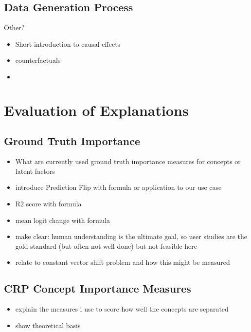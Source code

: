 \subsection{Data Generation Process}

Other?

\begin{itemize}
    \item Short introduction to causal effects    \item counterfactuals
    \item
\end{itemize}


\section{Evaluation of Explanations}
\subsection{Ground Truth Importance}
\begin{itemize}
    \item What are currently used ground truth importance measures for concepts or latent factors
    \item introduce Prediction Flip with formula or application to our use case
    \item R2 score with formula \cite{Sixt2020}
    \item mean logit change with formula
    \item make clear: human understanding is the ultimate goal, so user studies are the gold standard (but often not well done) but not feasible here
    \item relate to constant vector shift problem and how this might be measured
\end{itemize}
\subsection{CRP Concept Importance Measures}
\begin{itemize}
    \item explain the measures i use to score how well the concepts are separated
    \item show theoretical basis
\end{itemize}

